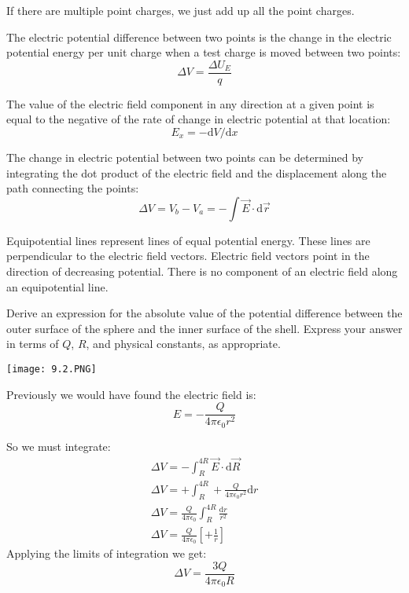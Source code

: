 \documentclass[../em.tex]{subfiles}
\begin{document}
If there are multiple point charges, we just add up all the point charges.

The electric potential difference between two points is the change in the electric potential energy
per unit charge when a test charge is moved between two points:
\[\Delta{V}=\frac{\Delta{U_E}}{q}\]

The value of the electric field component in any direction at a given point is equal to the 
negative of the rate of change in electric potential at that location:
\[E_x=-\mathrm{d}V/\mathrm{d}x\]

The change in electric potential between two points can be determined by integrating the dot product
of the electric field and the displacement along the path connecting the points:
\[\Delta{V}=V_b-V_a=-\int{\vec{E}\cdot\mathrm{d}\vec{r}}\]

Equipotential lines represent lines of equal potential energy. These lines are perpendicular to the electric field vectors.
Electric field vectors point in the direction of decreasing potential. There is no component of an electric field along an equipotential line.

\pagebreak
\begin{example}
    Derive an expression for the absolute value of the potential difference between the outer surface
    of the sphere and the inner surface of the shell. Express your answer in terms of $Q$, $R$, and physical constants,
    as appropriate.

    \begin{center}
        \texttt{[image: 9.2.PNG]}
    \end{center}

    Previously we would have found the electric field is:
    \[E=-\frac{Q}{4\pi\epsilon_0r^2}\]

    So we must integrate:
    \begin{align*}
    \Delta V=-\int_R^{4R}\vec{E}\cdot\mathrm{d}\vec{R} \\
    \Delta V = +\int_R^{4R}+\frac{Q}{4\pi\epsilon_0 r^2}\mathrm{d}r\\
    \Delta V = \frac{Q}{4\pi\epsilon_0}\int_R^{4R}\frac{\mathrm{d}r}{r^2}\\
    \Delta V = \frac{Q}{4\pi\epsilon_0}\left[+\frac{1}{r}\right]
    \end{align*}
    Applying the limits of integration we get: 
    \[\Delta V = \frac{3Q}{4\pi\epsilon_0 R}\]
\end{example}
\end{document}
